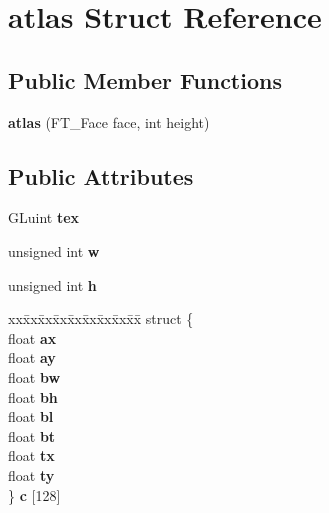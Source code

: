 \hypertarget{structatlas}{}\section{atlas Struct Reference}
\label{structatlas}
\subsection*{Public Member Functions}
\begin{DoxyCompactItemize}
\item 
{\bfseries atlas} (F\+T\+\_\+\+Face face, int height)\hypertarget{structatlas_acff7316647fa402c573edcf150eea8f6}{}\label{structatlas_acff7316647fa402c573edcf150eea8f6}

\end{DoxyCompactItemize}
\subsection*{Public Attributes}
\begin{DoxyCompactItemize}
\item 
G\+Luint {\bfseries tex}\hypertarget{structatlas_a404771e1eaa3c2566b9edc706e11348d}{}\label{structatlas_a404771e1eaa3c2566b9edc706e11348d}

\item 
unsigned int {\bfseries w}\hypertarget{structatlas_a9c95ce93a23b235ef4dc53bac9752b07}{}\label{structatlas_a9c95ce93a23b235ef4dc53bac9752b07}

\item 
unsigned int {\bfseries h}\hypertarget{structatlas_ad780d19f50dcc0435b7fd9493326599d}{}\label{structatlas_ad780d19f50dcc0435b7fd9493326599d}

\item 
\begin{tabbing}
xx\=xx\=xx\=xx\=xx\=xx\=xx\=xx\=xx\=\kill
struct \{\\
\>float {\bfseries ax}\\
\>float {\bfseries ay}\\
\>float {\bfseries bw}\\
\>float {\bfseries bh}\\
\>float {\bfseries bl}\\
\>float {\bfseries bt}\\
\>float {\bfseries tx}\\
\>float {\bfseries ty}\\
\} {\bfseries c} \mbox{[}128\mbox{]}\hypertarget{structatlas_a010cf923db6de0a7a4923d7f6dd2175e}{}\label{structatlas_a010cf923db6de0a7a4923d7f6dd2175e}
\\

\end{tabbing}\end{DoxyCompactItemize}


